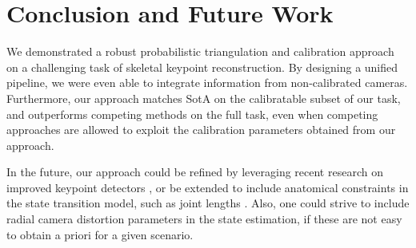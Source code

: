 \documentclass[sigconf, nonacm]{acmart}
\begin{document}
\section{Conclusion and Future Work}
We demonstrated a robust probabilistic triangulation and calibration approach on a challenging task of skeletal keypoint reconstruction. By designing a unified pipeline, we were even able to integrate information from non-calibrated cameras. Furthermore, our approach matches SotA on the calibratable subset of our task, and outperforms competing methods on the full task, even when competing approaches are allowed to exploit the calibration parameters obtained from our approach. \par
In the future, our approach could be refined by leveraging recent research on improved keypoint detectors \cite{Biderman2024}, or be extended to include anatomical constraints in the state transition model, such as joint lengths \cite{Joska2021}. Also, one could strive to include radial camera distortion parameters in the state estimation, if these are not easy to obtain a priori for a given scenario.











\end{document}

